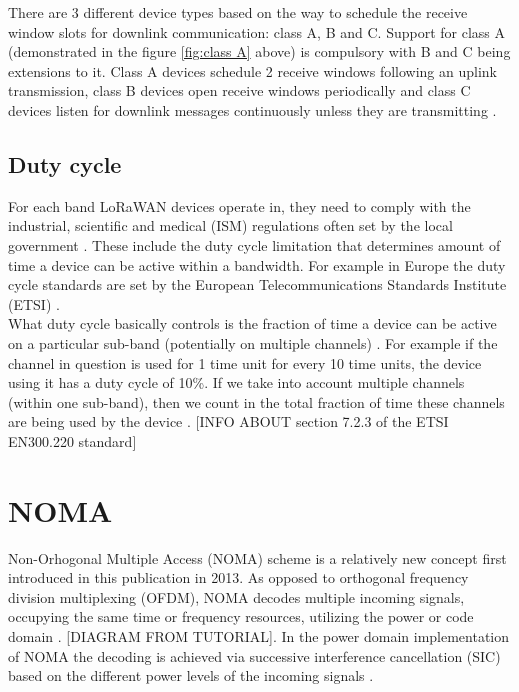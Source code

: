 There are 3 different device types based on the way to schedule the receive window slots for downlink communication: class A, B and C. Support for class A (demonstrated in the figure \ref{fig:class A} above) is compulsory with B and C being extensions to it. Class A devices schedule 2 receive windows following an uplink transmission, class B devices open receive windows periodically and class C devices listen for downlink messages continuously unless they are transmitting \cite{lora_alliance_spec}. 

\subsection{Duty cycle}
For each band LoRaWAN devices operate in, they need to comply with the industrial, scientific and medical (ISM) regulations often set by the local government \cite{duty_cycle}. These include the duty cycle limitation that determines amount of time a device can be active within a bandwidth. For example in Europe the duty cycle standards are set by the 
European Telecommunications Standards Institute (ETSI) \cite{about_etsi}.\\

What duty cycle basically controls is the fraction of time a device can be active on a particular sub-band (potentially on multiple channels) \cite{duty_cycle}. For example if the channel in 
question is used for 1 time unit for every 10 time units,
the device using it has a duty cycle of 10\%. If we take into account multiple channels (within one sub-band), then we count in the total fraction of time these channels are being used by the device \cite{duty_cycle}. [INFO ABOUT section 7.2.3 of the ETSI EN300.220 standard]

\section{NOMA}
 
 Non-Orhogonal Multiple Access (NOMA) scheme is a relatively new concept first introduced in this publication \cite{noma_original} in 2013. As opposed to orthogonal
frequency division multiplexing (OFDM), NOMA decodes multiple incoming signals, occupying the same time 
or frequency resources, utilizing the power or code domain \cite{noma_imperial}. [DIAGRAM FROM TUTORIAL]. In the power domain implementation of NOMA the decoding is achieved via successive interference cancellation (SIC) based on the different power levels of the incoming signals \cite{noma_imperial} \cite{noma_original}. \\

